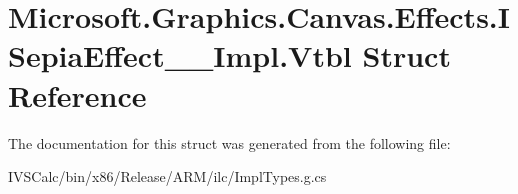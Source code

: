 \hypertarget{struct_microsoft_1_1_graphics_1_1_canvas_1_1_effects_1_1_i_sepia_effect_____impl_1_1_vtbl}{}\section{Microsoft.\+Graphics.\+Canvas.\+Effects.\+I\+Sepia\+Effect\+\_\+\+\_\+\+Impl.\+Vtbl Struct Reference}
\label{struct_microsoft_1_1_graphics_1_1_canvas_1_1_effects_1_1_i_sepia_effect_____impl_1_1_vtbl}


The documentation for this struct was generated from the following file\+:\begin{DoxyCompactItemize}
\item 
I\+V\+S\+Calc/bin/x86/\+Release/\+A\+R\+M/ilc/Impl\+Types.\+g.\+cs\end{DoxyCompactItemize}
